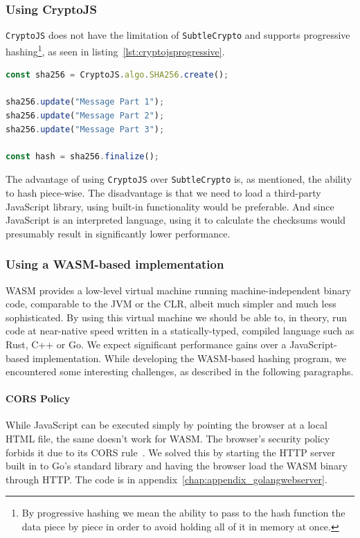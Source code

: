 \subsubsection{Using CryptoJS}
\label{subsubsec:cryptojs}
\texttt{CryptoJS} does not have the limitation of \texttt{SubtleCrypto} and supports progressive hashing\footnote{
By progressive hashing we mean the ability to pass to the hash function the data piece by piece in order to avoid holding all of it in memory at once.},
as seen in listing~\ref{lst:cryptojsprogressive}.

\begin{lstlisting}[caption={Progressive SHA-256 hashing using CryptoJS},captionpos=b,language=JavaScript,label={lst:cryptojsprogressive}]
const sha256 = CryptoJS.algo.SHA256.create();

sha256.update("Message Part 1");
sha256.update("Message Part 2");
sha256.update("Message Part 3");

const hash = sha256.finalize();
\end{lstlisting}

The advantage of using \texttt{CryptoJS} over \texttt{SubtleCrypto} is, as mentioned, the ability to hash piece-wise.
The disadvantage is that we need to load a third-party JavaScript library, using built-in functionality would be preferable.
And since JavaScript is an interpreted language, using it to calculate the checksums would presumably result in significantly lower performance.


\subsubsection{Using a WASM-based implementation}
\label{subsubsec:wasmhashing}
\gls{WASM} provides a low-level virtual machine running machine-independent binary code, comparable to the \gls{JVM} or the \gls{CLR}, albeit much simpler and much less sophisticated.
By using this virtual machine we should be able to, in theory, run code at near-native speed written in a statically-typed, compiled language such as Rust, C++ or Go.
We expect significant performance gains over a JavaScript-based implementation.
While developing the \gls{WASM}-based hashing program, we encountered some interesting challenges, as described in the following paragraphs.

\paragraph{CORS Policy} While JavaScript can be executed simply by pointing the browser at a local \gls{HTML} file, the same doesn't work for \gls{WASM}.
The browser's security policy forbids it due to its \gls{CORS} rule~\cite{cors}.
We solved this by starting the \gls{HTTP} server built in to Go's standard library and having the browser load the \gls{WASM} binary through \gls{HTTP}.
The code is in appendix~\ref{chap:appendix_golangwebserver}.

